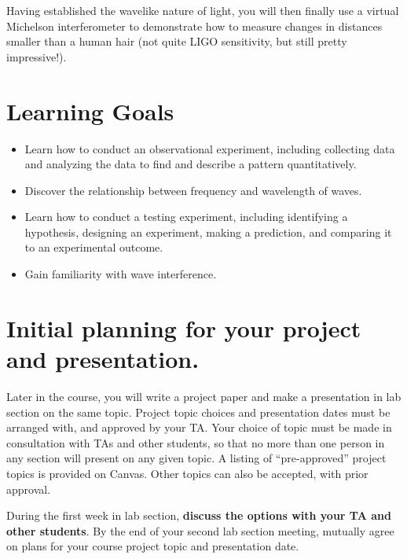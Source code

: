 Having established the wavelike nature of light, you will then finally use a 
virtual
Michelson interferometer to demonstrate how to measure changes in distances smaller than a human hair (not quite LIGO sensitivity, but still pretty impressive!).

\section{Learning Goals}

\begin{itemize}
	\item Learn how to conduct an observational experiment, including collecting data and analyzing the data to find and describe a pattern quantitatively.
	
	\item Discover the relationship between frequency and wavelength of waves.
	
	\item Learn how to conduct a testing experiment, including identifying a hypothesis, designing an experiment, making a prediction, and comparing it to an experimental outcome.
	
	\item Gain familiarity with wave interference.
\end{itemize}

\section{Initial planning for your project and presentation.}

Later in the course, you will write a project paper and make a presentation in lab section  on the same topic.  Project topic choices and presentation dates must be arranged with, and approved by your TA. Your choice of topic must be made in consultation with TAs and other students, so that no more than one person in any section will present on any given topic. A listing 
of ``pre-approved'' project topics is provided on Canvas. Other topics can also be accepted, with prior approval.

During the first week in lab section, \textbf{discuss the options with your TA and other students}.  By the end of your  second  lab section meeting, mutually agree on plans for your course project topic and presentation date.


